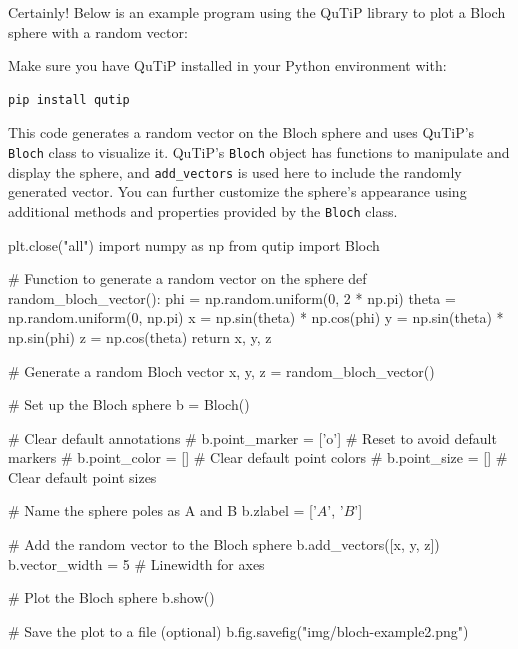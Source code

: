 \begin{airesult}
Certainly! Below is an example program using the QuTiP library to plot a Bloch sphere with a random
vector:

\vsp

Make sure you have QuTiP installed in your Python environment with:
\begin{verbatim}
pip install qutip
\end{verbatim}

This code generates a random vector on the Bloch sphere and uses QuTiP's \verb|Bloch| class to
visualize
it. QuTiP's \verb|Bloch| object has functions to manipulate and display the sphere, and
\verb|add_vectors| is
used here to include the randomly generated vector. You can further customize the sphere's
appearance using additional methods and properties provided by the \verb|Bloch| class.
\end{airesult}


  \begin{python}
  plt.close("all")
  import numpy as np
  from qutip import Bloch

  # Function to generate a random vector on the sphere
  def random_bloch_vector():
      phi = np.random.uniform(0, 2 * np.pi)
      theta = np.random.uniform(0, np.pi)
      x = np.sin(theta) * np.cos(phi)
      y = np.sin(theta) * np.sin(phi)
      z = np.cos(theta)
      return x, y, z

  # Generate a random Bloch vector
  x, y, z = random_bloch_vector()

  # Set up the Bloch sphere
  b = Bloch()

  # Clear default annotations
  # b.point_marker = ['o']  # Reset to avoid default markers
  # b.point_color = []      # Clear default point colors
  # b.point_size = []       # Clear default point sizes

  # Name the sphere poles as A and B
  b.zlabel = ['$A$', '$B$']

  # Add the random vector to the Bloch sphere
  b.add_vectors([x, y, z])
  b.vector_width = 5  # Linewidth for axes

  # Plot the Bloch sphere
  b.show()

  # Save the plot to a file (optional)
  b.fig.savefig("img/bloch-example2.png")
  \end{python}


